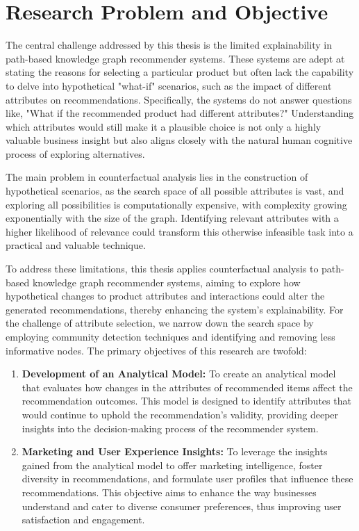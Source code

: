 \section{Research Problem and Objective}

The central challenge addressed by this thesis is the limited explainability in
path-based knowledge graph recommender systems. These systems are adept at stating
the reasons for selecting a particular product but often lack the capability to delve
into hypothetical "what-if" scenarios, such as the impact of different
attributes on recommendations. Specifically, the systems do not answer questions
like, "What if the recommended product had different attributes?" Understanding
which attributes would still make it a plausible choice is not only a highly
valuable business insight but also aligns closely with the natural human
cognitive process of exploring alternatives.

The main problem in counterfactual analysis lies in the construction of
hypothetical scenarios, as the search space of all possible attributes is vast,
and exploring all possibilities is computationally expensive, with complexity growing
exponentially with the size of the graph. Identifying relevant attributes with a
higher likelihood of relevance could transform this otherwise infeasible task
into a practical and valuable technique.

To address these limitations, this thesis applies counterfactual analysis to path-based
knowledge graph recommender systems, aiming to explore how hypothetical changes
to product attributes and interactions could alter the generated recommendations,
thereby enhancing the system's explainability. For the challenge of attribute
selection, we narrow down the search space by employing community detection techniques
and identifying and removing less informative nodes.
The primary objectives of this research are twofold:

\begin{enumerate}
	\item \textbf{Development of an Analytical Model:} To create an analytical
		model that evaluates how changes in the attributes of recommended items
		affect the recommendation outcomes. This model is designed to identify attributes
		that would continue to uphold the recommendation's validity, providing
		deeper insights into the decision-making process of the recommender system.

	\item \textbf{Marketing and User Experience Insights:} To leverage the
		insights gained from the analytical model to offer marketing intelligence, foster
		diversity in recommendations, and formulate user profiles that influence
		these recommendations. This objective aims to enhance the way businesses understand
		and cater to diverse consumer preferences, thus improving user satisfaction
		and engagement.
\end{enumerate}

